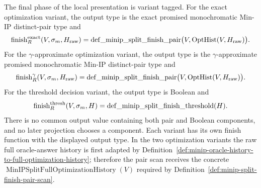 \begin{definition}
  \label{def:minip-bi-to-mono-local-phase-variant-finish}
  The final phase of the local presentation is variant tagged.  For the exact
  optimization variant, the output type is the exact promised monochromatic
  Min-IP distinct-pair type and
  \[
    \operatorname{finish}_R^{\rm exact}(V,\sigma_m,H_{\rm raw})
      =
    \operatorname{def\_minip\_split\_finish\_pair}
      \bigl(V,\operatorname{OptHist}(V,H_{\rm raw})\bigr).
  \]
  For the $\gamma$-approximate optimization variant, the output type is the
  $\gamma$-approximate promised monochromatic Min-IP distinct-pair type and
  \[
    \operatorname{finish}_R^{\gamma}(V,\sigma_m,H_{\rm raw})
      =
    \operatorname{def\_minip\_split\_finish\_pair}
      \bigl(V,\operatorname{OptHist}(V,H_{\rm raw})\bigr).
  \]
  For the threshold decision variant, the output type is Boolean and
  \[
    \operatorname{finish}_R^{\rm thresh}(V,\sigma_m,H)
      =
    \operatorname{def\_minip\_split\_finish\_threshold}(H).
  \]
  There is no common output value containing both pair and Boolean components,
  and no later projection chooses a component.  Each variant has its own
  finish function with the displayed output type.  In the two optimization
  variants the raw full oracle-answer history is first adapted by
  Definition~\ref{def:minip-oracle-history-to-full-optimization-history};
  therefore the pair scan receives the concrete
  $\operatorname{MinIPSplitFullOptimizationHistory}(V)$ required by
  Definition~\ref{def:minip-split-finish-pair-scan}.
\end{definition}

